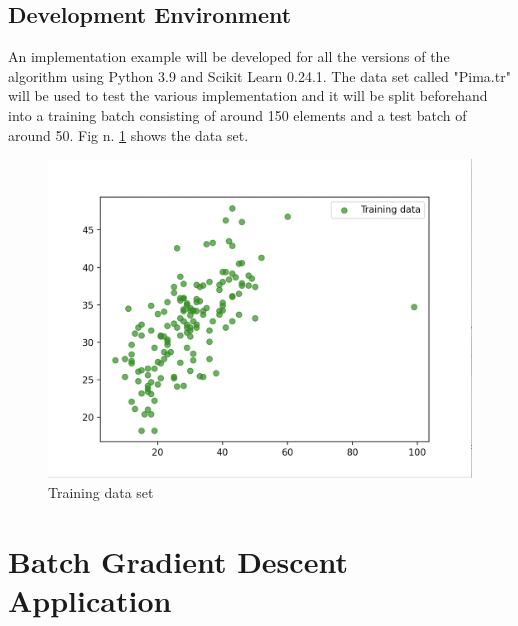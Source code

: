 \documentclass[conference]{IEEEtran}
\begin{document}
\subsection{Development Environment}
An implementation example will be developed for all the versions of the algorithm using Python 3.9 and Scikit Learn 0.24.1. The data set called "Pima.tr" will be used to test the various implementation and it will be split beforehand into a training batch consisting of around 150 elements and a test batch of around 50. Fig n. \ref{fig:data_set} shows the data set. 
\begin{center}
    \begin{figure}[ht]
    \includegraphics[scale=0.3]{Schermata 2021-05-11 alle 15.57.18.png}
    \caption{Training data set}
    \label{fig:data_set}
\end{figure}
\end{center}



\section{Batch Gradient Descent Application}
\end{document}

